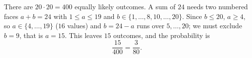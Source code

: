 There are $20\cdot20=400$ equally likely outcomes. A sum of $24$ needs two numbered faces $a+b=24$ with $1\le a\le19$ and $b\in\{1,\dots,8,10,\dots,20\}$. Since $b\le20$, $a\ge4$, so $a\in\{4,\dots,19\}$ ($16$ values) and $b=24-a$ runs over $5,\dots,20$; we must exclude $b=9$, that is $a=15$. This leaves $15$ outcomes, and the probability is
\[
\dfrac{15}{400}=\boxed{\dfrac{3}{80}}.
\]
